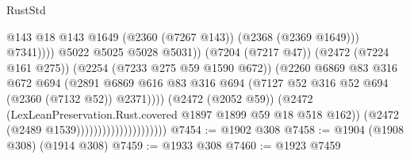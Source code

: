 \begin{lexlean}{RustStd}
\begin{coremodule}
                                                          @143
                                                          @18
                                                          @143
                                                          @1649
                                                          (@2360 (@7267 @143))
                                                          (@2368 (@2369 @1649)))
                                                        @7341))))
                                                @5022
                                                @5025
                                                @5028
                                                @5031))
                                            (@7204 (@7217 @47))
                                            (@2472 (@7224 @161 @275))
                                            (@2254 (@7233 @275 @59 @1590 @672))
                                            (@2260
                                              @6869
                                              @83
                                              @316
                                              @672
                                              @694
                                              (@2891
                                                @6869
                                                @616
                                                @83
                                                @316
                                                @694
                                                (@7127
                                                  @52
                                                  @316
                                                  @52
                                                  @694
                                                  (@2360 (@7132 @52))
                                                  @2371))))
                                          (@2472 (@2052 @59))
                                          (@2472
                                            (LexLeanPreservation.Rust.covered
                                              @1897
                                              @1899
                                              @59
                                              @18
                                              @518
                                              @162))
                                          (@2472 (@2489 @1539)))))))))))))))))))))
@7454 := @1902 @308
@7458 := @1904 (@1908 @308) (@1914 @308)
@7459 := @1933 @308
@7460 := @1923 @7459

\end{coremodule}
\end{lexlean}
